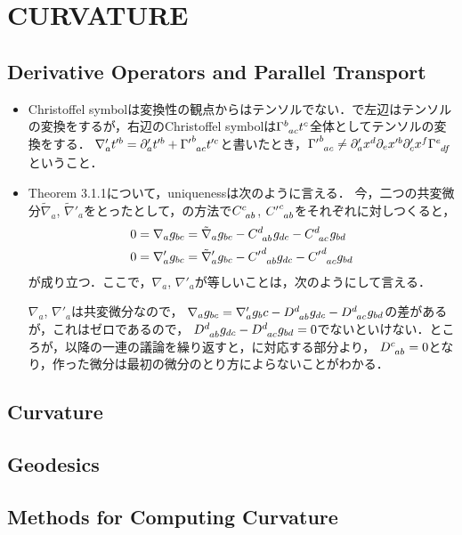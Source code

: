 \section{CURVATURE}
\subsection{Derivative Operators and Parallel Transport}
\begin{itemize}
	\item Christoffel symbolは変換性の観点からはテンソルでない．で左辺はテンソルの変換をするが，右辺のChristoffel symbolは$\Gamma\indices{^b_{ac}}t^c$全体としてテンソルの変換をする．
		$\nabla'_a t'^b = \partial'_a t'^b +{\Gamma'}\indices{^b_{ac}}t'^c$と書いたとき，${\Gamma'}\indices{^b_a_c} \neq \partial'_ax^d\partial_ex'^b\partial'_cx^f \Gamma\indices{^e_d_f}$ということ．
	\item Theorem 3.1.1について，uniquenessは次のように言える．
		今，二つの共変微分$\tilde{\nabla}_a$, $\tilde{\nabla}'_a$をとったとして，の方法で$C\indices{^c_a_b}$, ${C'}\indices{^c_a_b}$をそれぞれに対しつくると，
		\begin{align}
			0 &= \nabla_ag_{bc} = \tilde{\nabla}_a g_{bc} - C\indices{^d_a_b}g_{dc} - C\indices{^d_a_c}g_{bd}\\
			0 &= \nabla'_ag_{bc} = \tilde{\nabla}'_a g_{bc} - {C'}\indices{^d_a_b}g_{dc} - {C'}\indices{^d_a_c}g_{bd}
		\end{align}
		が成り立つ．ここで，$\nabla_a$, $\nabla'_a$が等しいことは，次のようにして言える．

		$\nabla_a$, $\nabla'_a$は共変微分なので，
		$\nabla_ag_{bc} = \nabla'_ag_bc - D\indices{^d_a_b}g_{dc} - D\indices{^d_a_c}g_{bd}$の差があるが，これはゼロであるので，
		$D\indices{^d_a_b}g_{dc} - D\indices{^d_a_c}g_{bd} = 0$でないといけない．ところが，以降の一連の議論を繰り返すと，に対応する部分より，
		$D\indices{^c_a_b} = 0$となり，作った微分は最初の微分のとり方によらないことがわかる．
\end{itemize}
\subsection{Curvature}
\subsection{Geodesics}
\subsection{Methods for Computing Curvature}

